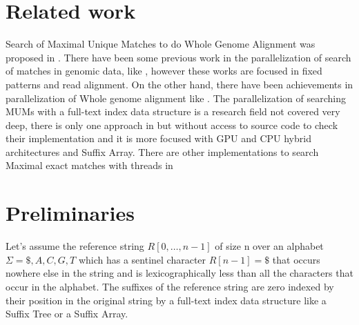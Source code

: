 \documentclass{acm_proc_article-sp}
\begin{document}
\section{Related work}
Search of Maximal Unique Matches to do Whole Genome Alignment was proposed in \cite{Delcher1999}. There have been some previous work in the parallelization of search of matches in genomic data, like \cite{OguzhanKulekci2011,Mongelli,Kouzinopoulos2005}, however these works are focused in fixed patterns and read alignment. On the other hand, there have been achievements in parallelization of Whole genome alignment like \cite{Meng2005}. The parallelization of searching MUMs with a full-text index data structure is a research field not covered very deep, there is only one approach in \cite{Encarnac2011} but without access to source code to check their implementation and it is more focused with GPU and CPU hybrid architectures and Suffix Array. There are other implementations to search Maximal exact matches with threads in \cite{Vyverman2013,OguzhanKulekci2011,Khan2009,OhlebuschGK10}
\section{Preliminaries}
Let's assume the reference string $R[0,\ldots, n − 1]$ of size n over an alphabet $\Sigma={ \$, A, C, G, T}$ which has a sentinel character $R[n − 1] = \$$ that occurs nowhere else in the string and is lexicographically less than all the characters that occur in the alphabet. The suffixes of the reference string are zero indexed by their position in the original string by a full-text index data structure like a Suffix Tree or a Suffix Array. 
\end{document}
